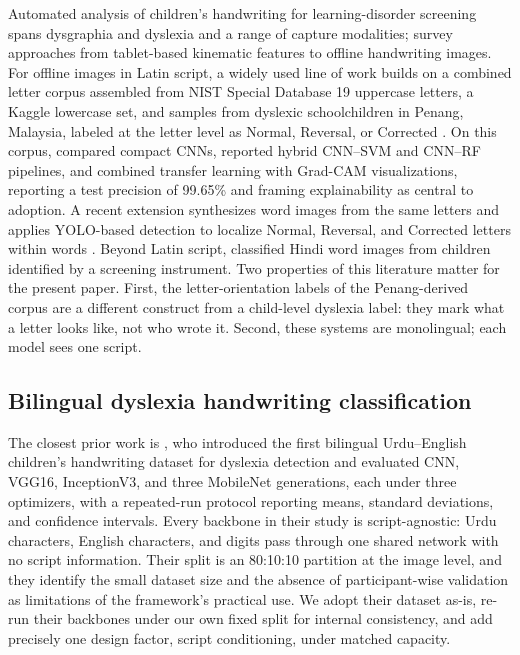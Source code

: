 \documentclass[11pt,a4paper]{article}
\begin{document}
Automated analysis of children's handwriting for learning-disorder
screening spans dysgraphia and dyslexia and a range of capture
modalities; \citet{kunhoth2022} survey approaches from tablet-based
kinematic features to offline handwriting images. For offline images
in Latin script, a widely used line of work builds on a combined
letter corpus assembled from NIST Special Database 19 uppercase
letters, a Kaggle lowercase set, and samples from dyslexic
schoolchildren in Penang, Malaysia, labeled at the letter level as
Normal, Reversal, or Corrected \citep{isa2019, alqahtani2023,
robaa2024}. On this corpus, \citet{isa2019} compared compact CNNs,
\citet{alqahtani2023} reported hybrid CNN--SVM and CNN--RF pipelines,
and \citet{robaa2024} combined transfer learning with Grad-CAM
visualizations, reporting a test precision of 99.65\% and framing
explainability as central to adoption. A recent extension synthesizes
word images from the same letters and applies YOLO-based detection to
localize Normal, Reversal, and Corrected letters within words
\citep{yolo2025}. Beyond Latin script, \citet{yogarajah2020} classified
Hindi word images from children identified by a screening instrument.
Two properties of this literature matter for the present paper.
First, the letter-orientation labels of the Penang-derived corpus are
a different construct from a child-level dyslexia label: they mark
what a letter looks like, not who wrote it. Second, these systems are
monolingual; each model sees one script.

\subsection{Bilingual dyslexia handwriting classification}

The closest prior work is \citet{kashif2026}, who introduced the
first bilingual Urdu--English children's handwriting dataset for
dyslexia detection and evaluated CNN, VGG16, InceptionV3, and three
MobileNet generations, each under three optimizers, with a
repeated-run protocol reporting means, standard deviations, and
confidence intervals. Every backbone in their study is
script-agnostic: Urdu characters, English characters, and digits pass
through one shared network with no script information. Their split is
an 80:10:10 partition at the image level, and they identify the small
dataset size and the absence of participant-wise validation as
limitations of the framework's practical use. We adopt their dataset
as-is, re-run their backbones under our own fixed split for internal
consistency, and add precisely one design factor, script
conditioning, under matched capacity.
\end{document}
